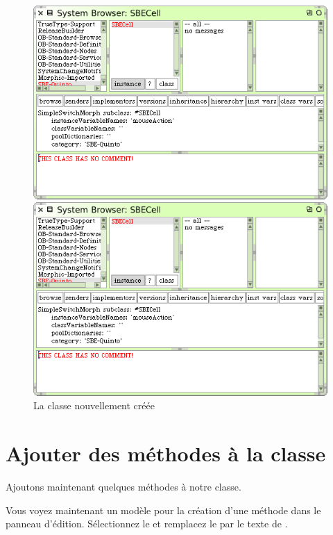 \documentclass[a4paper,10pt,twoside]{book}
\begin{document}

\begin{figure}[h!t]
\ifluluelse
	{\centerline {\includegraphics[width=\textwidth]{SBECell}}}
	{\centerline {\includegraphics[scale=0.7]{SBECell}}}
\caption{La classe nouvellement créée \label{fig:SBECell}}
\end{figure}

\section{Ajouter des méthodes à la classe}

Ajoutons maintenant quelques méthodes à notre classe.

Vous voyez maintenant un modèle pour la création d'une méthode dans le panneau d'édition.
Sélectionnez le et remplacez le par le texte de .
\end{document}
